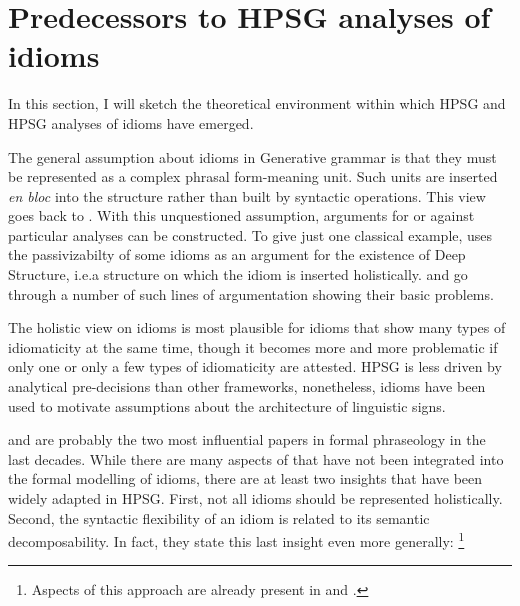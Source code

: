 \documentclass[output=paper]{langsci/langscibook}
\begin{document}




\section{Predecessors to HPSG analyses of idioms}
\label{Sec-Predecessors}


In this section, I will sketch the theoretical environment within which HPSG and HPSG analyses of idioms have emerged.

The general assumption about idioms in Generative grammar is that they
must be represented as a complex phrasal form-meaning unit. 
Such units are inserted \emph{en bloc} into the structure rather than built by syntactic operations.
This view goes back to \cite[]{Chomsky:65}. 
With this unquestioned assumption, arguments for or against particular analyses can be constructed. 
To give just one classical example, \cite{Chomsky81a} uses the passivizabilty of some idioms as an argument for the existence of Deep Structure, i.e.\@ a structure on which the idiom is inserted holistically. 
%
\cite{Ruwet:91} and \cite{NSW94a} go through a number of such lines of argumentation showing their basic problems. 

The holistic view on idioms is most plausible for idioms that show many types of idiomaticity at the same time, though it becomes more and more problematic if only one or only a few types of idiomaticity are attested.
HPSG is less driven by analytical pre-decisions than other frameworks, nonetheless, idioms have been used to motivate assumptions about the architecture of linguistic signs.

\cite{WSN84a-u} and \cite{NSW94a} are probably the two most influential papers in formal phraseology in the last decades. 
While there are many aspects of \cite{NSW94a} that have not been integrated into the formal modelling of idioms, 
there are at least two insights that have been widely adapted in HPSG.
First, not all idioms should be represented holistically. 
Second, the syntactic flexibility of an idiom is related to its semantic decomposability. In fact, they state this last insight even more generally:%
\footnote{Aspects of this approach are already present in \cite{Higgins:74} and \cite{Newmeyer:74}.}
\end{document}
